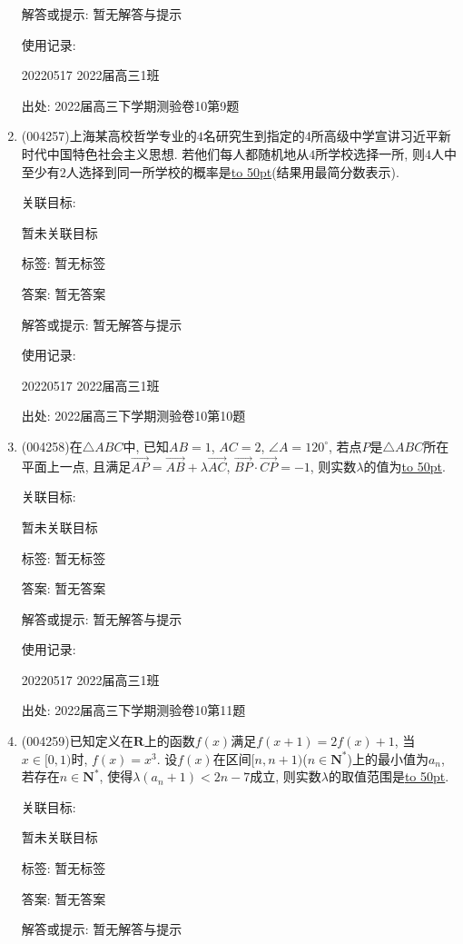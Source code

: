 \documentclass[10pt,a4paper]{article}
\newcommand{\blank}[1]{\underline{\hbox to #1pt{}}}
\begin{document}
\begin{enumerate}[1.]
解答或提示: 暂无解答与提示

使用记录:

20220517	2022届高三1班	


出处: 2022届高三下学期测验卷10第9题
\item { (004257)}上海某高校哲学专业的$4$名研究生到指定的4所高级中学宣讲习近平新时代中国特色社会主义思想. 若他们每人都随机地从$4$所学校选择一所, 则$4$人中至少有$2$人选择到同一所学校的概率是\blank{50}(结果用最简分数表示).


关联目标:

暂未关联目标



标签: 暂无标签

答案: 暂无答案

解答或提示: 暂无解答与提示

使用记录:

20220517	2022届高三1班	


出处: 2022届高三下学期测验卷10第10题
\item { (004258)}在$\triangle ABC$中, 已知$AB=1$, $AC=2$, $\angle A=120^\circ$, 若点$P$是$\triangle ABC$所在平面上一点, 且满足$\overrightarrow{AP}=\overrightarrow{AB}+\lambda \overrightarrow{AC}$, $\overrightarrow{BP}\cdot \overrightarrow{CP}=-1$, 则实数$\lambda$的值为\blank{50}.


关联目标:

暂未关联目标



标签: 暂无标签

答案: 暂无答案

解答或提示: 暂无解答与提示

使用记录:

20220517	2022届高三1班	


出处: 2022届高三下学期测验卷10第11题
\item { (004259)}已知定义在$\mathbf{R}$上的函数$f(x)$满足$f(x+1)=2f(x)+1$, 当$x\in [0,1)$时, $f(x)=x^3$. 设$f(x)$在区间$[n,n+1)$($n\in \mathbf{N}^*$)上的最小值为$a_n$, 若存在$n\in \mathbf{N}^*$, 使得$\lambda (a_n+1)<2n-7$成立, 则实数$\lambda$的取值范围是\blank{50}.


关联目标:

暂未关联目标



标签: 暂无标签

答案: 暂无答案

解答或提示: 暂无解答与提示


\end{enumerate}
\end{document}

